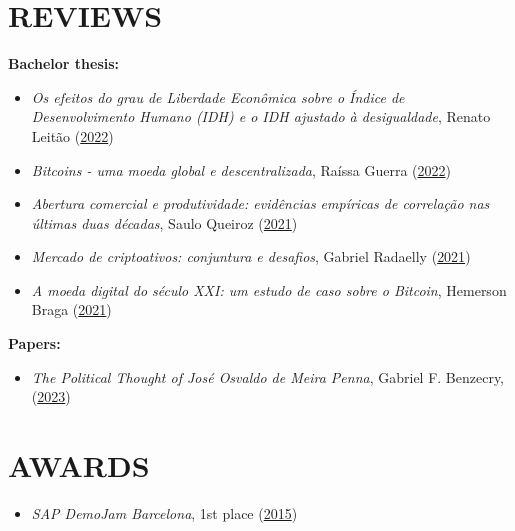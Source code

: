 \documentclass[margin]{res} %
\begin{document}
\begin{resume}
		\section{REVIEWS}
		{\bf Bachelor thesis:}
		\begin{itemize}
			\item {\sl Os efeitos do grau de Liberdade Econômica sobre o Índice de Desenvolvimento Humano (IDH) e o IDH ajustado à desigualdade}, Renato Leitão (\href{https://saboia.it/assets/pdf/reviews/2022-02-15-renato-leitao.pdf}{2022})
			\item {\sl Bitcoins - uma moeda global e descentralizada}, Raíssa Guerra (\href{https://saboia.it/assets/pdf/reviews/2022-02-15-raissa-guerra.pdf}{2022})
			\item {\sl Abertura comercial e produtividade: evidências empíricas de correlação nas últimas duas décadas}, Saulo Queiroz (\href{https://saboia.it/assets/pdf/reviews/2021-08-26-saulo-queiroz.pdf}{2021})
			\item {\sl Mercado de criptoativos: conjuntura e desafios}, Gabriel Radaelly (\href{https://saboia.it/assets/pdf/reviews/2021-08-25-gabriel-radaelly.pdf}{2021})
			\item {\sl A moeda digital do século XXI: um estudo de caso sobre o Bitcoin}, Hemerson Braga (\href{https://saboia.it/assets/pdf/reviews/2022-07-07-hemerson-braga.pdf}{2021})
		\end{itemize}
		{\bf Papers:}
		\begin{itemize}
			\item {\sl The Political Thought of José Osvaldo de Meira Penna}, Gabriel F. Benzecry, (\href{https://jls.mises.org/article/70305-the-political-thought-of-jose-osvaldo-de-meira-penna}{2023})
		\end{itemize}
		\hfill

		\section{AWARDS}
		\begin{itemize}
			\item {\sl SAP DemoJam Barcelona}, 1st place (\href{https://www.uni.li/en/topics/information-systems/news/university-students-successful-in-world2019s-leading-sap-conference}{2015})
		\end{itemize}
		\hfill


\end{resume}
\end{document}
